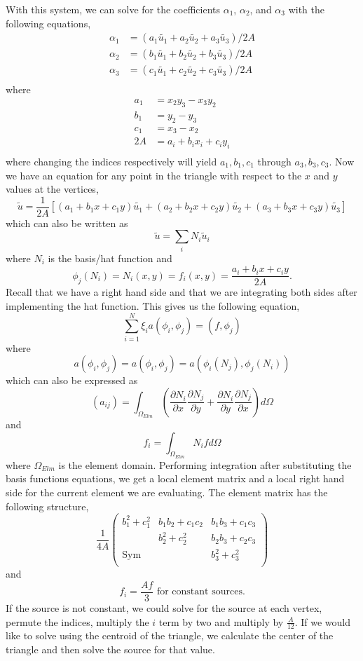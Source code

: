 \documentclass[11pt, oneside]{article}   	%
\begin{document}
With this system, we can solve for the coefficients $\alpha_1$, $\alpha_2$,  and $\alpha_3$ with the following equations,
\begin{align*}
\alpha_1 &= (a_1 \tilde{u_1} + a_2 \tilde{u_2} + a_3 \tilde{u_3})/2A\\
\alpha_2 &= (b_1 \tilde{u_1} + b_2 \tilde{u_2} + b_3 \tilde{u_3})/2A\\
\alpha_3 &= (c_1 \tilde{u_1} + c_2 \tilde{u_2} + c_3 \tilde{u_3})/2A\\
\end{align*}
where 
\begin{align*}
a_1 &= x_2 y_3 - x_3 y_2\\
b_1 &= y_2 - y_3\\
c_1 &= x_3 - x_2\\
2A &= a_i +b_i x_i + c_i y_i\\
\end{align*}
where changing the indices respectively will yield $a_1,b_1,c_1$ through $a_3, b_3, c_3$. Now we have an equation for any point in the triangle with respect to the $x$ and $y$ values at the vertices,
\[
\tilde{u} = \frac{1}{2A}[(a_1 + b_1 x + c_1 y)\tilde{u_1} + (a_2 + b_2 x + c_2 y)\tilde{u_2} + (a_3 + b_3 x + c_3 y)\tilde{u_3}]
\]
which can also be written as
\[
\tilde{u} = \sum_i N_i \tilde{u}_i
\]
where $N_i$ is the basis/hat function and 
\[
\phi_j(N_i) = N_i(x,y) = f_i(x,y) = \frac{a_i +b_i x + c_i y}{2A}.
\]
Recall that we have a right hand side and that we are integrating both sides after implementing the hat function. This gives us the following equation,
\[
\sum_{i=1}^N \xi_i a(\phi_i, \phi_j) = (f,\phi_j)
\]
where
\[
a(\phi_i,\phi_j) = a(\phi_i,\phi_j) = a(\phi_i(N_j), \phi_j(N_i))
\]
which can also be expressed as
\[
(a_{ij}) = \int_{\Omega_{Elm}} \left( \frac{\partial N_i}{\partial x} \frac{\partial N_j}{\partial y} + \frac{\partial N_i}{\partial y} \frac{\partial N_j}{\partial x} \right) d \Omega
\]
and
\[
f_i = \int_{\Omega_{Elm}} N_i f d \Omega
\]
where $\Omega_{Elm}$ is the element domain. Performing integration after substituting the basis functions equations, we get a local element matrix and a local right hand side for the current element we are evaluating. The element matrix has the following structure,
\[
\frac{1}{4A} \begin{pmatrix}
b_1^2 + c_1^2 & b_1 b_2 + c_1 c_2 & b_1 b_3 + c_1 c_3 \\
 & b_2^2 + c_2^2 & b_2 b_3 + c_2 c_3\\
\text{Sym} & & b_3^2 + c_3^2\\
\end{pmatrix}
\]
and
\[
f_i = \frac{Af}{3} \text{ for constant sources.}
\]
If the source is not constant, we could solve for the source at each vertex, permute the indices, multiply the $i$ term by two and multiply by $\frac{A}{12}$. If we would like to solve using the centroid of the triangle, we calculate the center of the triangle and then solve the source for that value. 
\end{document}
